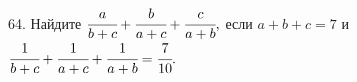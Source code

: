 64. Найдите $\cfrac{a}{b+c}+\cfrac{b}{a+c}+\cfrac{c}{a+b},$ если $a+b+c=7$ и $\cfrac{1}{b+c}+\cfrac{1}{a+c}+\cfrac{1}{a+b}=\cfrac{7}{10}.$\\
